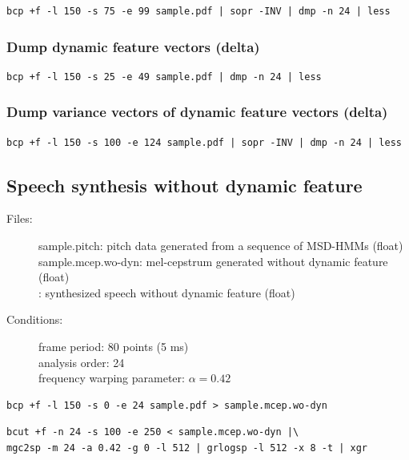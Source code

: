 \documentclass[a4paper,10pt]{article}
\begin{document}
\begin{verbatim}
bcp +f -l 150 -s 75 -e 99 sample.pdf | sopr -INV | dmp -n 24 | less
\end{verbatim}

\subsubsection{Dump dynamic feature vectors (delta)}

\begin{verbatim}
bcp +f -l 150 -s 25 -e 49 sample.pdf | dmp -n 24 | less
\end{verbatim}

\subsubsection{Dump variance vectors of dynamic feature vectors (delta)}

\begin{verbatim}
bcp +f -l 150 -s 100 -e 124 sample.pdf | sopr -INV | dmp -n 24 | less
\end{verbatim}

\subsection{Speech synthesis without dynamic feature}

\begin{description}
\item[Files:]
  sample.pitch: pitch data generated from a sequence of MSD-HMMs (float)\\
  sample.mcep.wo-dyn: mel-cepstrum generated without dynamic
  feature (float) \\
  :
  synthesized speech without dynamic feature (float)
\item[Conditions:]
  frame period: 80 points (5 ms)\\
  analysis order: 24\\
  frequency warping parameter: $\alpha = 0.42$
\end{description}

\begin{verbatim}
bcp +f -l 150 -s 0 -e 24 sample.pdf > sample.mcep.wo-dyn
\end{verbatim}
 
\begin{verbatim}
bcut +f -n 24 -s 100 -e 250 < sample.mcep.wo-dyn |\
mgc2sp -m 24 -a 0.42 -g 0 -l 512 | grlogsp -l 512 -x 8 -t | xgr
\end{verbatim}
\end{document}
